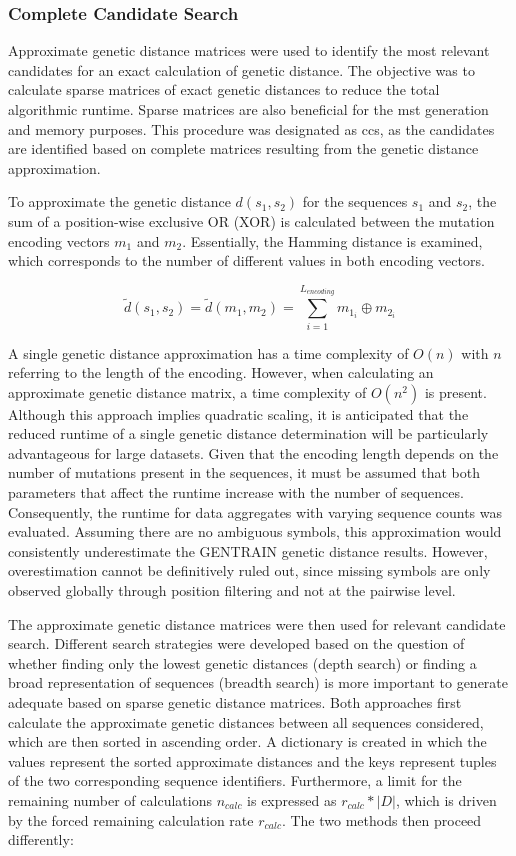 \subsubsection{Complete Candidate Search}
\label{sec:accurate_candidate_search}
Approximate genetic distance matrices were used to identify the most relevant candidates for an exact calculation of genetic distance. The objective was to calculate sparse matrices of exact genetic distances to reduce the total algorithmic runtime. Sparse matrices are also beneficial for the \acrshort{mst} generation and memory purposes. This procedure was designated as \acrfull{ccs}, as the candidates are identified based on complete matrices resulting from the genetic distance approximation. 

To approximate the genetic distance ${d}(s_1,s_2)$ for the sequences $s_1$ and $s_2$, the sum of a position-wise exclusive OR (XOR) is calculated between the mutation encoding vectors $m_1$ and $m_2$. Essentially, the Hamming distance is examined, which corresponds to the number of different values in both encoding vectors.

$$\tilde{d}(s_1, s_2) = \tilde{d}(m_1, m_2) = \sum_{i=1}^{L_{encoding}} m_{1_i} \oplus m_{2_i}$$

A single genetic distance approximation has a time complexity of $O(n)$ with $n$ referring to the length of the encoding. However, when calculating an approximate genetic distance matrix, a time complexity of $O(n^2)$ is present. Although this approach implies quadratic scaling, it is anticipated that the reduced runtime of a single genetic distance determination will be particularly advantageous for large datasets. Given that the encoding length depends on the number of mutations present in the sequences, it must be assumed that both parameters that affect the runtime increase with the number of sequences. Consequently, the runtime for data aggregates with varying sequence counts was evaluated. Assuming there are no ambiguous symbols, this approximation would consistently underestimate the GENTRAIN genetic distance results. However, overestimation cannot be definitively ruled out, since missing symbols are only observed globally through position filtering and not at the pairwise level.

The approximate genetic distance matrices were then used for relevant candidate search. Different search strategies were developed based on the question of whether finding only the lowest genetic distances (depth search) or finding a broad representation of sequences (breadth search) is more important to generate adequate  based on sparse genetic distance matrices.
Both approaches first calculate the approximate genetic distances between all sequences considered, which are then sorted in ascending order. A dictionary is created in which the values represent the sorted approximate distances and the keys represent tuples of the two corresponding sequence identifiers. Furthermore, a limit for the remaining number of calculations $n_{calc}$ is expressed as $r_{calc}*|D|$, which is driven by the forced remaining calculation rate $r_{calc}$. The two methods then proceed differently:


